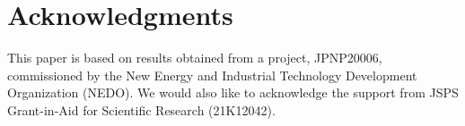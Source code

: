 \documentclass[a4paper,fleqn]{cas-dc}
\begin{document}
\section*{Acknowledgments}
This paper is based on results obtained from a project, JPNP20006, commissioned by the New Energy and Industrial Technology Development Organization (NEDO). We would also like to acknowledge the support from JSPS Grant-in-Aid for Scientific Research (21K12042).
\end{document}
